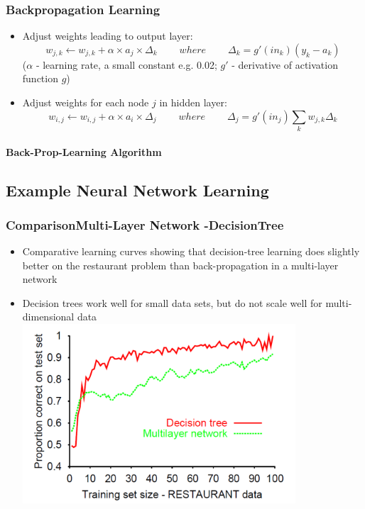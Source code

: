 \documentclass[conference, a4paper]{styles/acmsiggraph}
\newcommand\subsubsubsection{\paragraph}
\begin{document}
        \subsubsection{Backpropagation Learning}
            \begin{itemize}
                \item Adjust weights leading to output layer:
                $$w_{j,k} \leftarrow w_{j,k} + \alpha \times a_j \times \Delta_k\ \ \ \ \ \ \ \ \ \ where\ \ \ \ \ \ \ \ \ \ \Delta_k = g'(in_k)(y_k - a_k)$$
                ($\alpha$ - learning rate, a small constant e.g. 0.02; $g'$ - derivative of activation function $g$)
                \item Adjust weights for each node $j$ in hidden layer:
                $$w_{i,j} \leftarrow w_{i,j} + \alpha \times a_i \times \Delta_j\ \ \ \ \ \ \ \ \ \ where\ \ \ \ \ \ \ \ \ \ \Delta_j = g'(in_j) \sum\limits_{k} w_{j,k} \Delta_k$$
            \end{itemize}
            
            \subsubsubsection{Back-Prop-Learning Algorithm}
        \subsection{Example Neural Network Learning}
        
        
    
    
    
        \subsubsection{ComparisonMulti-Layer Network -DecisionTree}
            \begin{itemize}
                \item Comparative learning curves showing that decision-tree learning does slightly better on the restaurant problem than back-propagation in a multi-layer network
                \item Decision trees work well for small data sets, but do not scale well for multi-dimensional data\newline
                \includegraphics[width=0.8\textwidth]{imgs/ComparisonMultiLayerNetwork.png}
            \end{itemize}
        
\end{document}
